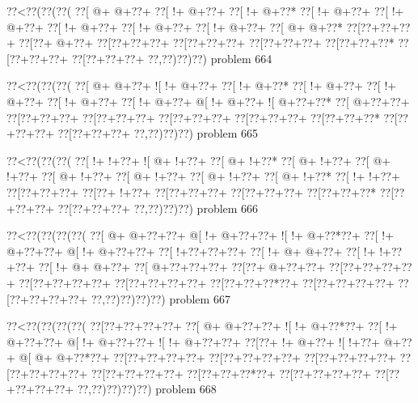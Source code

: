 \vbox{\vbox{\goo
\0??<\0??(\0??(\0??(
\0??[\- @+\- @+\0??+
\0??[\- !+\- @+\0??+
\0??[\- !+\- @+\0??*
\0??[\- !+\- @+\0??+
\0??[\- !+\- @+\0??+
\0??[\- !+\- @+\0??+
\0??[\- !+\- @+\0??+
\0??[\- !+\- @+\0??+
\0??[\- @+\- @+\0??*
\0??[\0??+\0??+\0??+
\0??[\0??+\- @+\0??+
\0??[\0??+\0??+\0??+
\0??[\0??+\0??+\0??+
\0??[\0??+\0??+\0??+
\0??[\0??+\0??+\0??*
\0??[\0??+\0??+\0??+
\0??[\0??+\0??+\0??+
\0??,\0??)\0??)\0??)
}
\hfil problem 664\hfil\break
}

\vbox{\vbox{\goo
\0??<\0??(\0??(\0??(
\0??[\- @+\- @+\0??+
\- ![\- !+\- @+\0??+
\0??[\- !+\- @+\0??*
\0??[\- !+\- @+\0??+
\0??[\- !+\- @+\0??+
\0??[\- !+\- @+\0??+
\0??[\- !+\- @+\0??+
\- @[\- !+\- @+\0??+
\- ![\- @+\0??+\0??*
\0??[\- @+\0??+\0??+
\0??[\0??+\0??+\0??+
\0??[\0??+\0??+\0??+
\0??[\0??+\0??+\0??+
\0??[\0??+\0??+\0??+
\0??[\0??+\0??+\0??*
\0??[\0??+\0??+\0??+
\0??[\0??+\0??+\0??+
\0??,\0??)\0??)\0??)
}
\hfil problem 665\hfil\break
}

\vbox{\vbox{\goo
\0??<\0??(\0??(\0??(
\0??[\- !+\- !+\0??+
\- ![\- @+\- !+\0??+
\0??[\- @+\- !+\0??*
\0??[\- @+\- !+\0??+
\0??[\- @+\- !+\0??+
\0??[\- @+\- !+\0??+
\0??[\- @+\- !+\0??+
\0??[\- @+\- !+\0??+
\0??[\- @+\- !+\0??*
\0??[\- !+\- !+\0??+
\0??[\0??+\0??+\0??+
\0??[\0??+\- !+\0??+
\0??[\0??+\0??+\0??+
\0??[\0??+\0??+\0??+
\0??[\0??+\0??+\0??*
\0??[\0??+\0??+\0??+
\0??[\0??+\0??+\0??+
\0??,\0??)\0??)\0??)
}
\hfil problem 666\hfil\break
}

\vbox{\vbox{\goo
\0??<\0??(\0??(\0??(\0??(
\0??[\- @+\- @+\0??+\0??+
\- @[\- !+\- @+\0??+\0??+
\- ![\- !+\- @+\0??*\0??+
\0??[\- !+\- @+\0??+\0??+
\- @[\- !+\- @+\0??+\0??+
\0??[\- !+\0??+\0??+\0??+
\0??[\- !+\- @+\- @+\0??+
\0??[\- !+\- !+\0??+\0??+
\0??[\- !+\- @+\- @+\0??+
\0??[\- @+\0??+\0??+\0??+
\0??[\0??+\- @+\0??+\0??+
\0??[\0??+\0??+\0??+\0??+
\0??[\0??+\0??+\0??+\0??+
\0??[\0??+\0??+\0??+\0??+
\0??[\0??+\0??+\0??*\0??+
\0??[\0??+\0??+\0??+\0??+
\0??[\0??+\0??+\0??+\0??+
\0??,\0??)\0??)\0??)\0??)
}
\hfil problem 667\hfil\break
}

\vbox{\vbox{\goo
\0??<\0??(\0??(\0??(\0??(
\0??[\0??+\0??+\0??+\0??+
\0??[\- @+\- @+\0??+\0??+
\- ![\- !+\- @+\0??*\0??+
\0??[\- !+\- @+\0??+\0??+
\- @[\- !+\- @+\0??+\0??+
\- ![\- !+\- @+\0??+\0??+
\0??[\0??+\- !+\- @+\0??+
\- ![\- !+\0??+\- @+\0??+
\- @[\- @+\- @+\0??*\0??+
\0??[\0??+\0??+\0??+\0??+
\0??[\0??+\0??+\0??+\0??+
\0??[\0??+\0??+\0??+\0??+
\0??[\0??+\0??+\0??+\0??+
\0??[\0??+\0??+\0??+\0??+
\0??[\0??+\0??+\0??*\0??+
\0??[\0??+\0??+\0??+\0??+
\0??[\0??+\0??+\0??+\0??+
\0??,\0??)\0??)\0??)\0??)
}
\hfil problem 668\hfil\break
}

